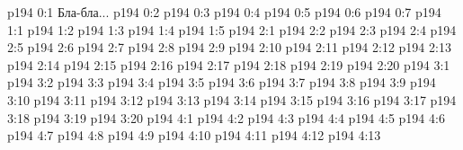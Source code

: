 \author{Промежуточные создания}
\vs p194 0:1  Бла-бла...
\vs p194 0:2 
\vs p194 0:3 \pc 
\vs p194 0:4 
\vs p194 0:5 
\vs p194 0:6 
\vs p194 0:7 
\vs p194 1:1 
\vs p194 1:2 
\vs p194 1:3 
\vs p194 1:4 
\vs p194 1:5 
\vs p194 2:1 
\vs p194 2:2 \pc 
\vs p194 2:3 
\vs p194 2:4 
\vs p194 2:5 
\vs p194 2:6 
\vs p194 2:7 
\vs p194 2:8 \pc 
\vs p194 2:9 
\vs p194 2:10 \pc 
\vs p194 2:11 \pc 
\vs p194 2:12 
\vs p194 2:13 
\vs p194 2:14 
\vs p194 2:15 
\vs p194 2:16 
\vs p194 2:17 
\vs p194 2:18 
\vs p194 2:19 
\vs p194 2:20 \pc 
{}
\vs p194 3:1 
\vs p194 3:2 
\vs p194 3:3 
\vs p194 3:4 
\vs p194 3:5 
\vs p194 3:6 \pc 
\vs p194 3:7 \pc 
\vs p194 3:8 
\vs p194 3:9 
\vs p194 3:10 
\vs p194 3:11 \pc 
\vs p194 3:12 
\vs p194 3:13 
\vs p194 3:14 \pc 
\vs p194 3:15 \pc 
\vs p194 3:16 \pc 
\vs p194 3:17 
\vs p194 3:18 \pc 
\vs p194 3:19 
\vs p194 3:20 \pc 
{}
\vs p194 4:1 
\vs p194 4:2 
\vs p194 4:3 
\vs p194 4:4 \pc 
\vs p194 4:5 
\vs p194 4:6 
\vs p194 4:7 
\vs p194 4:8 \pc 
\vs p194 4:9 \pc 
\vs p194 4:10 \pc 
\vs p194 4:11 
\vs p194 4:12 
\vs p194 4:13 
\quizlink
